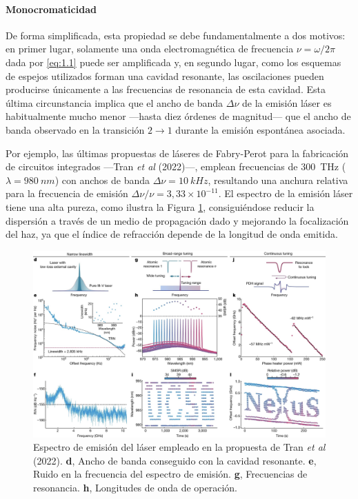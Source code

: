 \paragraph{Monocromaticidad}
De forma simplificada, esta propiedad se debe fundamentalmente a dos motivos: en primer lugar, solamente una onda electromagnética de frecuencia $\nu=\omega/2 \pi$ dada por \eqref{eq:1.1} puede ser amplificada y, en segundo lugar, como los esquemas de espejos utilizados forman una cavidad resonante, las oscilaciones pueden producirse únicamente a las frecuencias de resonancia de esta cavidad. Esta última circunstancia implica que el ancho de banda $\Delta\nu$ de la emisión láser es habitualmente mucho menor ---hasta diez órdenes de magnitud--- que el ancho de banda observado en la transición $2\rightarrow 1$ durante la emisión espontánea asociada.

Por ejemplo, las últimas propuestas de láseres de Fabry-Perot para la fabricación de circuitos integrados ---Tran \emph{et al} (2022)\autocite{Tran2022}---, emplean frecuencias de \qty{300}{THz} ($\lambda = \qty{980}{nm}$) con anchos de banda $\Delta\nu = \qty{10}{kHz}$, resultando una anchura relativa para la frecuencia de emisión $\Delta\nu/\nu = 3,33\times 10^{-11}$. El espectro de la emisión láser tiene una alta pureza, como ilustra la Figura \ref{fig:1.7}, consiguiéndose reducir la dispersión a través de un medio de propagación dado y mejorando la focalización del haz, ya que el índice de refracción depende de la longitud de onda emitida.

\begin{figure}[htpb]
  \centering
  \includegraphics[width=\textwidth]{Figuras/ch1_amplif.png}
  \caption{Espectro de emisión del láser empleado en la propuesta de Tran \emph{et al} (2022)\autocite{Tran2022}. \textbf{d}, Ancho de banda conseguido con la cavidad resonante. \textbf{e}, Ruido en la frecuencia del espectro de emisión. \textbf{g}, Frecuencias de resonancia. \textbf{h}, Longitudes de onda de operación.}
  \label{fig:1.7}
\end{figure}

